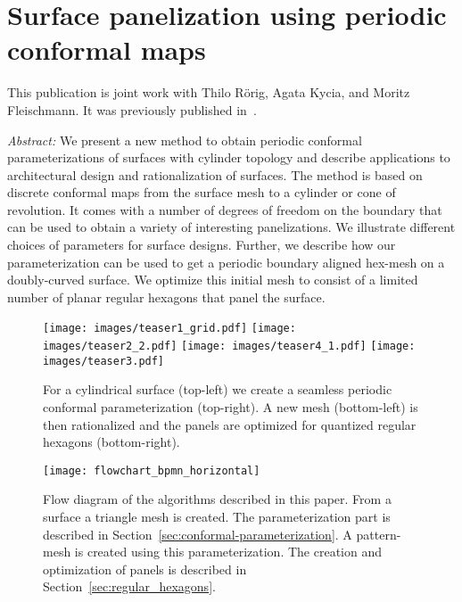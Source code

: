 \documentclass[Thesis.tex]{subfiles}
\begin{document}
\chapter{Surface panelization using periodic conformal maps}
\label{chp:periodic_conformal_maps}

This publication is joint work with Thilo R\"orig, Agata Kycia, and 
Moritz Fleischmann. It was previously published in~\cite{Roerig2014}.

\emph{Abstract:} 
We present a new method to obtain periodic conformal parameterizations of
surfaces with cylinder topology and describe applications to
architectural design and rationalization of surfaces. The method is
based on discrete conformal maps from the surface mesh to a cylinder or
cone of revolution. It comes with a number of degrees of freedom on
the boundary that can be used to obtain a variety of interesting
panelizations. We illustrate different choices of parameters for
\nurbs surface designs. Further, we describe how our parameterization
can be used to get a periodic boundary aligned hex-mesh on a
doubly-curved surface. We optimize this initial mesh to consist of a
limited number of planar regular hexagons that panel the surface.

\begin{figure}
  \centering
  \texttt{[image: images/teaser1\_grid.pdf]}
  \texttt{[image: images/teaser2\_2.pdf]}
  \texttt{[image: images/teaser4\_1.pdf]}
  \texttt{[image: images/teaser3.pdf]}
  \caption{For a cylindrical \nurbs surface (top-left) we create a
    seamless periodic conformal parameterization (top-right). A new
    mesh (bottom-left) is then rationalized and the panels are
    optimized for quantized regular hexagons (bottom-right).}
  \label{fig:teaser2}
\end{figure}

\def\subfilebibliography{}


\begin{figure}[tb]
\centering
\texttt{[image: flowchart\_bpmn\_horizontal]}
\caption{Flow diagram of the algorithms described in this paper. From
  a \nurbs surface a triangle mesh is created. The parameterization
  part is described in Section~\ref{sec:conformal-parameterization}. A
  pattern-mesh is created using this parameterization. The creation
  and optimization of panels is described in
  Section~\ref{sec:regular_hexagons}.}
\label{fig:algorithm_diagram}
\end{figure}
\end{document}
